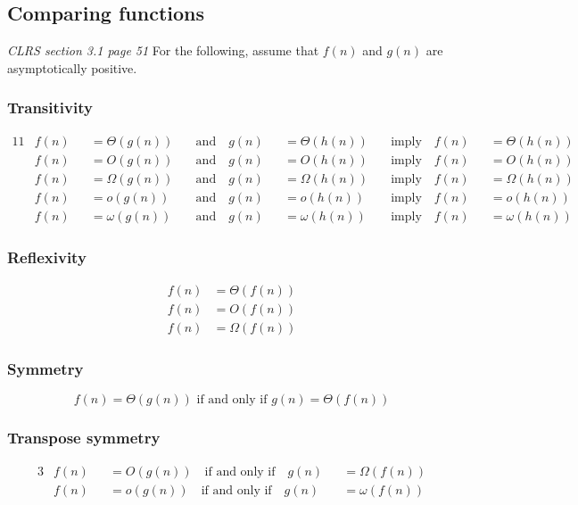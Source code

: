 \subsection{Comparing functions}
\textit{CLRS section 3.1 page 51}
For the following, assume that $ f(n) $ and $ g(n) $ are asymptotically positive.
\subsubsection{Transitivity}
\begin{alignat*}{11}
	&f(n) &&= \Theta(g(n)) &\quad\text{and}\quad g(n) &&= \Theta(h(n)) &\quad\text{imply}\quad f(n) &&= \Theta(h(n))\\
	&f(n) &&= O(g(n)) 	&\quad\text{and}\quad g(n) &&= O(h(n)) &\quad\text{imply}\quad f(n) &&= O(h(n))\\
	&f(n) &&= \Omega(g(n)) 	&\quad\text{and}\quad g(n) &&= \Omega(h(n)) &\quad\text{imply}\quad f(n) &&= \Omega(h(n))\\
	&f(n) &&= o(g(n)) 	&\quad\text{and}\quad g(n) &&= o(h(n)) &\quad\text{imply}\quad f(n) &&= o(h(n))\\
	&f(n) &&= \omega(g(n)) 	&\quad\text{and}\quad g(n) &&= \omega(h(n)) &\quad\text{imply}\quad f(n) &&= \omega(h(n))
\end{alignat*}

\subsubsection{Reflexivity}
\begin{align*}
	f(n) &= \Theta(f(n))\\
	f(n) &= O(f(n))\\
	f(n) &= \Omega(f(n))
\end{align*}

\subsubsection{Symmetry}
$$ f(n)=\Theta(g(n)) \text{ if and only if } g(n)=\Theta(f(n)) $$ 

\subsubsection{Transpose symmetry}
\begin{alignat*}{3}
	&f(n) &&= O(g(n)) \quad\text{if and only if}\quad  g(n) &&= \Omega(f(n))\\
	&f(n) &&= o(g(n)) \quad\text{if and only if}\quad  g(n) &&= \omega(f(n))
\end{alignat*}

